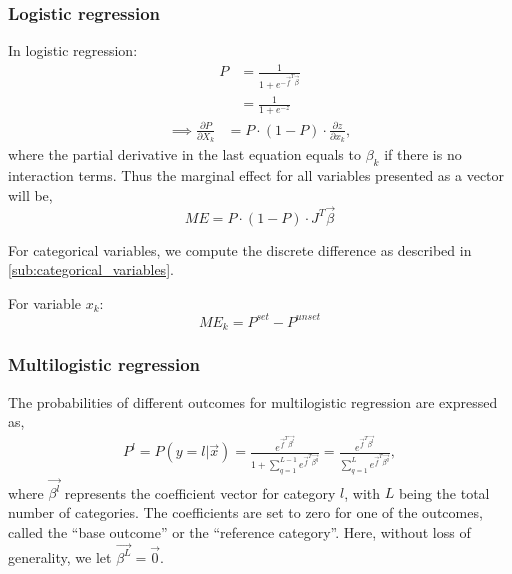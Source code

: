 \subsubsection{Logistic regression} %
\label{ssub:logistic_regression}
In logistic regression:
\begin{align*}
    P &= \frac{1}{1 + e^{-\vec{f}^T \vec{\beta}}} \\
    &= \frac{1}{1 + e^{-z}}
\end{align*}
\begin{align*}
  \implies \frac{\partial P}{\partial X_k} &= P \cdot (1-P) \cdot
  \frac{\partial z}{\partial x_k},
\end{align*}
where the partial derivative in the last equation equals to $\beta_k$
if there is no interaction terms. Thus the marginal effect for all variables
presented as a vector will be,
$$
    \mathit{ME} = P \cdot (1-P) \cdot J^T \vec{\beta}
$$

For categorical variables, we compute the discrete difference as described in
\ref{sub:categorical_variables}.

For variable $x_k$:
$$
    \mathit{ME_k} = P^{set} - P^{unset}
$$

\subsubsection{Multilogistic regression} %
\label{ssub:multilogistic_regression}
The probabilities of different outcomes for multilogistic regression are expressed as,
\begin{gather*}
    P^l = P(y=l | \vec{x})
    = \frac{e^{\vec{f}^T \vec{\beta^l}}}{1 + \displaystyle \sum_{q=1}^{L-1} e^{\vec{f}^T \vec{\beta^q}}}
    = \frac{e^{\vec{f}^T \vec{\beta^l}}}{\displaystyle \sum_{q=1}^{L} e^{\vec{f}^T \vec{\beta^q}}},
\end{gather*}
where $\vec{\beta^l}$ represents the coefficient vector for category $l$, with
$L$ being the total number of categories. The coefficients are set to zero for
one of the outcomes, called the ``base outcome'' or the ``reference category''.
Here, without loss of generality, we let $\vec{\beta^L} = \vec{0}$.


